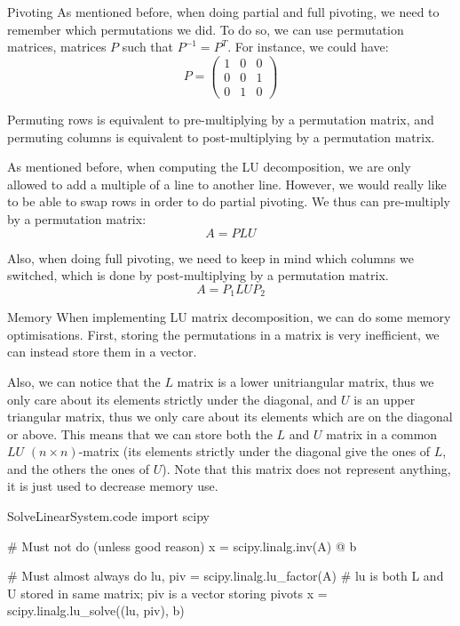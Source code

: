 \documentclass[a4paper]{article}
\begin{document}
\begin{parag}{Pivoting}
    As mentioned before, when doing partial and full pivoting, we need to remember which permutations we did. To do so, we can use permutation matrices, matrices $P$ such that $P ^{-1} = P^T$. For instance, we could have:
    \[P = \begin{pmatrix} 1 & 0 & 0 \\ 0 & 0 & 1 \\ 0 & 1 & 0 \end{pmatrix} \]
    
    Permuting rows is equivalent to pre-multiplying by a permutation matrix, and permuting columns is equivalent to post-multiplying by a permutation matrix.

    As mentioned before, when computing the LU decomposition, we are only allowed to add a multiple of a line to another line. However, we would really like to be able to swap rows in order to do partial pivoting. We thus can pre-multiply by a permutation matrix:
    \[A = PLU\]
    
    Also, when doing full pivoting, we need to keep in mind which columns we switched, which is done by post-multiplying by a permutation matrix.
    \[A = P_1 LU P_2\]
\end{parag}

\begin{parag}{Memory}
    When implementing LU matrix decomposition, we can do some memory optimisations. First, storing the permutations in a matrix is very inefficient, we can instead store them in a vector.

    Also, we can notice that the $L$ matrix is a lower unitriangular matrix, thus we only care about its elements strictly under the diagonal, and $U$ is an upper triangular matrix, thus we only care about its elements which are on the diagonal or above. This means that we can store both the $L$ and $U$ matrix in a common $LU$ $\left(n \times n\right)$-matrix (its elements strictly under the diagonal give the ones of $L$, and the others the ones of $U$). Note that this matrix does not represent anything, it is just used to decrease memory use. 
\end{parag}


\begin{filecontents*}[overwrite]{SolveLinearSystem.code}
import scipy

# Must not do (unless good reason)
x = scipy.linalg.inv(A) @ b

# Must almost always do
lu, piv = scipy.linalg.lu_factor(A)
# lu is both L and U stored in same matrix; piv is a vector storing pivots
x = scipy.linalg.lu_solve((lu, piv), b)
\end{filecontents*}
\end{document}
